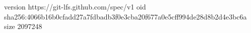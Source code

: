 version https://git-lfs.github.com/spec/v1
oid sha256:4066b16b0cfadd27a7fdbadb3f0e3cba20f677a0e5cff994de28d8b2d4e3bc6a
size 2097248
